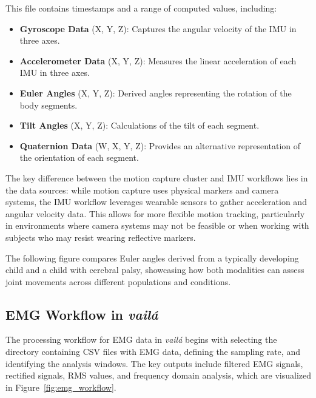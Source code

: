 \documentclass{article}
\begin{document}
This file contains timestamps and a range of computed values, including:
\begin{itemize}
    \item \textbf{Gyroscope Data} (X, Y, Z): Captures the angular velocity of the IMU in three axes.
    \item \textbf{Accelerometer Data} (X, Y, Z): Measures the linear acceleration of each IMU in three axes.
    \item \textbf{Euler Angles} (X, Y, Z): Derived angles representing the rotation of the body segments.
    \item \textbf{Tilt Angles} (X, Y, Z): Calculations of the tilt of each segment.
    \item \textbf{Quaternion Data} (W, X, Y, Z): Provides an alternative representation of the orientation of each segment.
\end{itemize}

The key difference between the motion capture cluster and IMU workflows lies in the data sources: while motion capture uses physical markers and camera systems, the IMU workflow leverages wearable sensors to gather acceleration and angular velocity data. This allows for more flexible motion tracking, particularly in environments where camera systems may not be feasible or when working with subjects who may resist wearing reflective markers.

The following figure compares Euler angles derived from a typically developing child and a child with cerebral palsy, showcasing how both modalities can assess joint movements across different populations and conditions.

\subsection{EMG Workflow in \textit{vailá}}

The processing workflow for EMG data in \textit{vailá} begins with selecting the directory containing CSV files with EMG data, defining the sampling rate, and identifying the analysis windows. The key outputs include filtered EMG signals, rectified signals, RMS values, and frequency domain analysis, which are visualized in Figure~\ref{fig:emg_workflow}.
\end{document}
